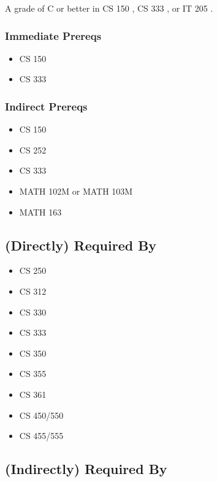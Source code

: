 \documentclass[]{article}
\providecommand{\tightlist}{%
  \setlength{\itemsep}{0pt}\setlength{\parskip}{0pt}}
\begin{document}
A grade of C or better in CS 150 , CS 333 , or IT 205 .

\subsubsection{Immediate Prereqs}\label{immediate-prereqs-5}

\begin{itemize}
\tightlist
\item
  CS 150
\item
  CS 333
\end{itemize}

\subsubsection{Indirect Prereqs}\label{indirect-prereqs-5}

\begin{multicols}{2}
\begin{itemize}
\tightlist
\item
  CS 150
\item
  CS 252
\item
  CS 333
\item
  MATH 102M or MATH 103M
\item
  MATH 163
\end{itemize}
\end{multicols}

\subsection{(Directly) Required By}\label{directly-required-by-3}

\begin{itemize}
\tightlist
\item
  CS 250
\item
  CS 312
\item
  CS 330
\item
  CS 333
\item
  CS 350
\item
  CS 355
\item
  CS 361
\item
  CS 450/550
\item
  CS 455/555
\end{itemize}

\subsection{(Indirectly) Required By}\label{indirectly-required-by-3}
\end{document}

